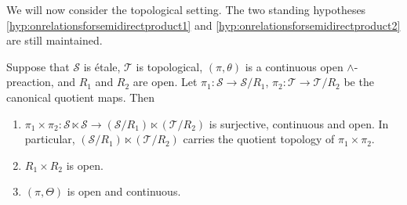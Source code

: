 We will now consider the topological setting. The two standing hypotheses \ref{hyp:onrelationsforsemidirectproduct1} and \ref{hyp:onrelationsforsemidirectproduct2} are still maintained.

\begin{lemma}\label{lem:topologicalpropertiesofacctionpasstoquotients}
Suppose that $\mathcal{S}$ is étale, $\mathcal{T}$ is topological, $(\pi,\theta)$ is a continuous open $\land$-preaction, and $R_1$ and $R_2$ are open. Let $\pi_1\colon\mathcal{S}\to\mathcal{S}/R_1$, $\pi_2\colon\mathcal{T}\to\mathcal{T}/R_2$ be the canonical quotient maps. Then
\begin{enumerate}[label=(\alph*)]
    \item\label{lem:topologicalpropertiesofacctionpasstoquotients1} $\pi_1\times\pi_2\colon\mathcal{S}\ltimes\mathcal{S}\to(\mathcal{S}/R_1)\ltimes(\mathcal{T}/R_2)$ is surjective, continuous and open. In particular, $(\mathcal{S}/R_1)\ltimes(\mathcal{T}/R_2)$ carries the quotient topology of $\pi_1\times\pi_2$.
    \item\label{lem:topologicalpropertiesofacctionpasstoquotients2} $R_1\times R_2$ is open.
    \item\label{lem:topologicalpropertiesofacctionpasstoquotients3} $(\pi,\Theta)$ is open and continuous.
\end{enumerate}
\end{lemma}
